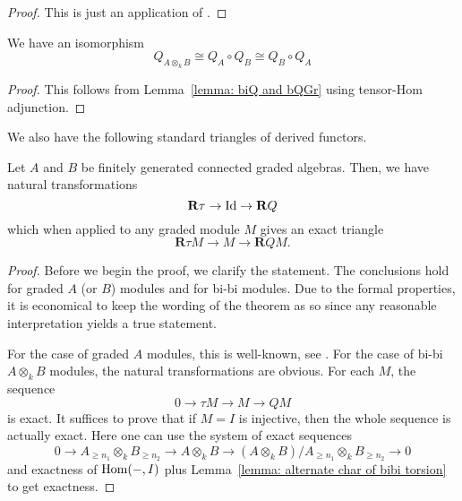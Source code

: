 \begin{proof}
  This is just an application of \cite[Cor. 1, III.3]{DCA62}.
\end{proof}

\begin{corollary}\label{corollary: relation on Qs}
  We have an isomorphism 
  \begin{displaymath}
    Q_{A \otimes_k B} \cong Q_A \circ Q_B \cong Q_B \circ Q_A
  \end{displaymath}
\end{corollary}

\begin{proof}
  This follows from Lemma~\ref{lemma: biQ and bQGr} using tensor-Hom adjunction. 
\end{proof}

We also have the following standard triangles of derived functors. 

\begin{lemma} \label{lemma: exact triangles}
    Let \(A\) and \(B\) be finitely generated connected graded algebras. Then, we have natural transformations 
  \begin{displaymath}
    \mathbf{R} \tau \to \operatorname{Id} \to \mathbf{R} Q 
  \end{displaymath}
  which when applied to any graded module \(M\) gives an exact triangle 
  \begin{displaymath}
    \mathbf{R} \tau M \to M \to \mathbf{R} Q M.
  \end{displaymath}
\end{lemma}

\begin{proof}
  Before we begin the proof, we clarify the statement. The conclusions hold for graded \(A\) (or \(B\)) modules and for bi-bi modules. Due to the formal properties, it is economical to keep the wording of the theorem as so since any reasonable interpretation yields a true statement. 
  
  For the case of graded \(A\) modules, this is well-known, see \parencite[Property 4.6]{BVdB}. For the case of bi-bi \(A \otimes_k B\) modules, the natural transformations are obvious. For each \(M\), the sequence 
  \begin{displaymath}
    0 \to \tau M \to M \to Q M
  \end{displaymath}
  is exact. It suffices to prove that if \(M = I\) is injective, then the whole sequence is actually exact. Here one can use the system of exact sequences
  \begin{displaymath}
    0 \to A_{\geq n_1} \otimes_k B_{\geq n_2} \to A \otimes_k B \to (A \otimes_k B) / A_{\geq n_1} \otimes_k B_{\geq n_2} \to 0
  \end{displaymath}
  and exactness of \(\operatorname{Hom}(-,I)\) plus Lemma~\ref{lemma: alternate char of bibi torsion} to get exactness. 
\end{proof}
